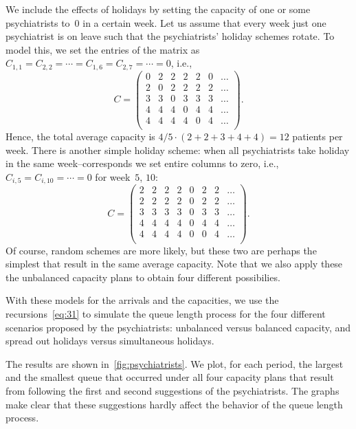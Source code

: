 \documentclass[stochastic-or.tex]{subfiles}
\begin{document}
We include the effects of holidays by setting the capacity of one or some  psychiatrists to~$0$ in a certain week.
Let us assume that every week just one psychiatrist is on leave such that the psychiatrists' holiday schemes rotate.
To model this, we set the entries of the matrix as $C_{1,1}=C_{2,2}=\cdots=C_{1,6}=C_{2,7} =\cdots = 0$, i.e.,
\begin{equation}\label{eq:11}
C =
 \begin{pmatrix}
 0 & 2 & 2 & 2 & 2 & 0 & \ldots \\
 2 & 0 & 2 & 2 & 2 & 2 & \ldots\\
 3 & 3 & 0 & 3 & 3 & 3 & \ldots\\
 4 & 4 & 4 & 0 & 4 & 4 & \ldots\\
 4 & 4 & 4 & 4 & 0 & 4 & \ldots\\
 \end{pmatrix}.
\end{equation}
Hence, the total average capacity is $4/5 \cdot (2+2+3+4+4) = 12$ patients per week.
There is another simple holiday scheme: when all psychiatrists take holiday in the same week--corresponds we  set  entire columns to zero, i.e., $C_{i,5}=C_{i,10}=\cdots=0$ for week~$5$, $10$:
\begin{equation}\label{eq:19}
C =
 \begin{pmatrix}
 2 & 2 & 2 & 2 & 0 &2 & 2 & \ldots \\
 2 & 2 & 2 & 2 & 0 &2 & 2 & \ldots\\
 3 & 3 & 3 & 3 & 0 & 3 & 3 & \ldots\\
 4 & 4 & 4 & 4 & 0 &4 & 4 & \ldots\\
 4 & 4 & 4 & 4 & 0 &0 & 4 & \ldots\\
 \end{pmatrix}.
\end{equation}
Of course, random schemes are more likely, but these two are perhaps the simplest that result in the same average capacity.
Note that we also apply these the unbalanced capacity plans to obtain four different possibilies.

With these  models for the arrivals and the capacities, we  use the recursions~\cref{eq:31} to simulate the queue length process for the four different scenarios proposed by the psychiatrists: unbalanced versus balanced capacity, and spread out holidays versus simultaneous holidays.

The results are shown in~\cref{fig:psychiatrists}.
We plot, for each period, the largest and the smallest queue that occurred under all four capacity plans that result from following the first and second suggestions of the psychiatrists.
The graphs make clear that these suggestions hardly affect the behavior of the queue length process.
\end{document}
